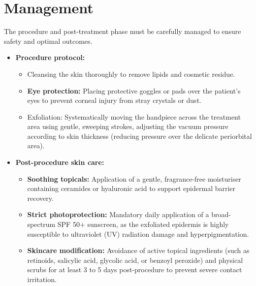 \section*{Management}
The procedure and post-treatment phase must be carefully managed to ensure safety and optimal outcomes.
\begin{itemize}
    \item \textbf{Procedure protocol:}
        \begin{itemize}
            \item Cleansing the skin thoroughly to remove lipids and cosmetic residue.
            \item \textbf{Eye protection:} Placing protective goggles or pads over the patient's eyes to prevent corneal injury from stray crystals or dust.
            \item Exfoliation: Systematically moving the handpiece across the treatment area using gentle, sweeping strokes, adjusting the vacuum pressure according to skin thickness (reducing pressure over the delicate periorbital area).
        \end{itemize}
    \item \textbf{Post-procedure skin care:}
        \begin{itemize}
            \item \textbf{Soothing topicals:} Application of a gentle, fragrance-free moisturiser containing ceramides or hyaluronic acid to support epidermal barrier recovery.
            \item \textbf{Strict photoprotection:} Mandatory daily application of a broad-spectrum SPF 50+ sunscreen, as the exfoliated epidermis is highly susceptible to ultraviolet (UV) radiation damage and hyperpigmentation.
            \item \textbf{Skincare modification:} Avoidance of active topical ingredients (such as retinoids, salicylic acid, glycolic acid, or benzoyl peroxide) and physical scrubs for at least 3 to 5 days post-procedure to prevent severe contact irritation.
        \end{itemize}
\end{itemize}

